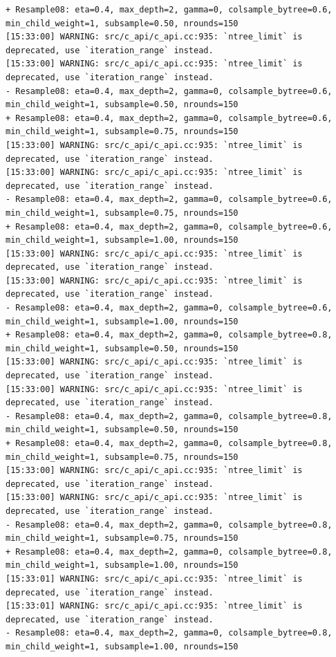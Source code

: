 \documentclass[
  letterpaper,
  DIV=11,
  numbers=noendperiod]{scrartcl}
\begin{document}
\begin{verbatim}
+ Resample08: eta=0.4, max_depth=2, gamma=0, colsample_bytree=0.6, min_child_weight=1, subsample=0.50, nrounds=150 
[15:33:00] WARNING: src/c_api/c_api.cc:935: `ntree_limit` is deprecated, use `iteration_range` instead.
[15:33:00] WARNING: src/c_api/c_api.cc:935: `ntree_limit` is deprecated, use `iteration_range` instead.
- Resample08: eta=0.4, max_depth=2, gamma=0, colsample_bytree=0.6, min_child_weight=1, subsample=0.50, nrounds=150 
+ Resample08: eta=0.4, max_depth=2, gamma=0, colsample_bytree=0.6, min_child_weight=1, subsample=0.75, nrounds=150 
[15:33:00] WARNING: src/c_api/c_api.cc:935: `ntree_limit` is deprecated, use `iteration_range` instead.
[15:33:00] WARNING: src/c_api/c_api.cc:935: `ntree_limit` is deprecated, use `iteration_range` instead.
- Resample08: eta=0.4, max_depth=2, gamma=0, colsample_bytree=0.6, min_child_weight=1, subsample=0.75, nrounds=150 
+ Resample08: eta=0.4, max_depth=2, gamma=0, colsample_bytree=0.6, min_child_weight=1, subsample=1.00, nrounds=150 
[15:33:00] WARNING: src/c_api/c_api.cc:935: `ntree_limit` is deprecated, use `iteration_range` instead.
[15:33:00] WARNING: src/c_api/c_api.cc:935: `ntree_limit` is deprecated, use `iteration_range` instead.
- Resample08: eta=0.4, max_depth=2, gamma=0, colsample_bytree=0.6, min_child_weight=1, subsample=1.00, nrounds=150 
+ Resample08: eta=0.4, max_depth=2, gamma=0, colsample_bytree=0.8, min_child_weight=1, subsample=0.50, nrounds=150 
[15:33:00] WARNING: src/c_api/c_api.cc:935: `ntree_limit` is deprecated, use `iteration_range` instead.
[15:33:00] WARNING: src/c_api/c_api.cc:935: `ntree_limit` is deprecated, use `iteration_range` instead.
- Resample08: eta=0.4, max_depth=2, gamma=0, colsample_bytree=0.8, min_child_weight=1, subsample=0.50, nrounds=150 
+ Resample08: eta=0.4, max_depth=2, gamma=0, colsample_bytree=0.8, min_child_weight=1, subsample=0.75, nrounds=150 
[15:33:00] WARNING: src/c_api/c_api.cc:935: `ntree_limit` is deprecated, use `iteration_range` instead.
[15:33:00] WARNING: src/c_api/c_api.cc:935: `ntree_limit` is deprecated, use `iteration_range` instead.
- Resample08: eta=0.4, max_depth=2, gamma=0, colsample_bytree=0.8, min_child_weight=1, subsample=0.75, nrounds=150 
+ Resample08: eta=0.4, max_depth=2, gamma=0, colsample_bytree=0.8, min_child_weight=1, subsample=1.00, nrounds=150 
[15:33:01] WARNING: src/c_api/c_api.cc:935: `ntree_limit` is deprecated, use `iteration_range` instead.
[15:33:01] WARNING: src/c_api/c_api.cc:935: `ntree_limit` is deprecated, use `iteration_range` instead.
- Resample08: eta=0.4, max_depth=2, gamma=0, colsample_bytree=0.8, min_child_weight=1, subsample=1.00, nrounds=150 

\end{verbatim}
\end{document}
